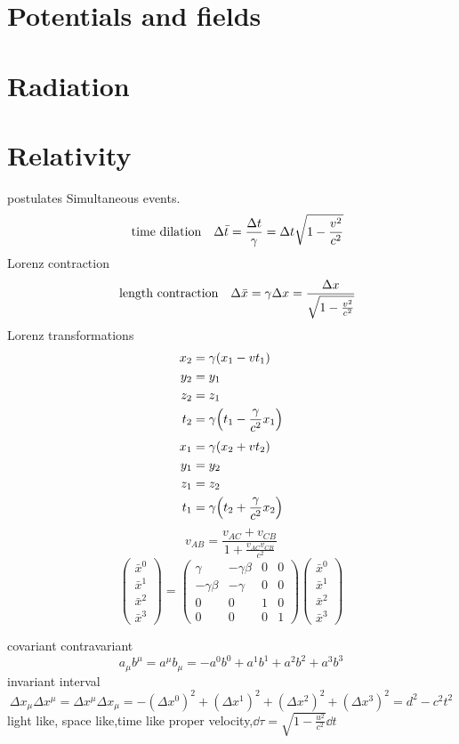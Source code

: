 \documentclass[12pt]{article}
\begin{document}
\section{Potentials and fields}

\section{Radiation}

\section{Relativity}
postulates
Simultaneous events.
\[\qq{time dilation} \Delta{\bar{t}}=\frac{\Delta{t}}{\gamma}=\Delta{t}\sqrt{1-\frac{v^2}{c^2}}\]
Lorenz contraction
\[\qq{length contraction} \Delta{\bar{x}}=\gamma\Delta{x}=\frac{\Delta{x}}{\sqrt{1-\frac{v^2}{c^2}}}\]
Lorenz transformations 
\begin{align*}
x_2&=\gamma(x_1-vt_1)\\y_2&=y_1\\z_2&=z_1\\t_2&=\gamma\qty(t_1-\frac{\gamma}{c^2}x_1)
\end{align*}
\begin{align*}
x_1&=\gamma(x_2+vt_2)\\y_1&=y_2\\z_1&=z_2\\t_1&=\gamma\qty(t_2+\frac{\gamma}{c^2}x_2)
\end{align*}
\[v_{AB}=\frac{v_{AC}+v_{CB}}{1+\frac{v_{AC}v_{CB}}{c^2}}\]
\[
\begin{pmatrix}
\bar{x}^0\\ \bar{x}^1\\ \bar{x}^2\\ \bar{x}^3
\end{pmatrix}
=
\begin{pmatrix}
\gamma& -\gamma\beta& 0& 0\\
-\gamma\beta& -\gamma& 0& 0\\
0& 0& 1& 0\\
0& 0& 0& 1
\end{pmatrix}
\begin{pmatrix}
\bar{x}^0\\ \bar{x}^1\\ \bar{x}^2\\ \bar{x}^3
\end{pmatrix}
\]

covariant contravariant
\[a_{\mu}b^{\mu}=a^{\mu}b_{\mu}=-a^{0}b^{0}+a^{1}b^{1}+a^{2}b^{2}+a^{3}b^{3}\]
invariant interval\[\Delta{x}_{\mu}\Delta{x}^{\mu}=\Delta{x}^{\mu}\Delta{x}_{\mu}=-(\Delta{x}^{0})^2+(\Delta{x}^{1})^2+(\Delta{x}^{2})^2+(\Delta{x}^{3})^2=d^2-c^2t^2\]
light like, space like,time like
proper velocity,$\dd{\tau}=\sqrt{1-\frac{u^2}{c^2}}\dd{t}$
\end{document}
